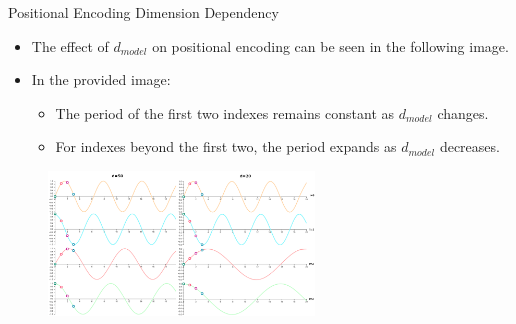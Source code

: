 \documentclass[serif, aspectratio=169]{beamer}
\begin{document}
\begin{frame}{Positional Encoding Dimension Dependency}
	\begin{itemize}
			\item The effect of \( d_{model} \) on positional encoding can be seen in the following image.
			\item In the provided image:
				\begin{itemize}
					\item The period of the first two indexes remains constant as \( d_{model} \) changes.
					\item For indexes beyond the first two, the period expands as \( d_{model} \) decreases.
				\end{itemize}
		
	\end{itemize}
	\vspace{-5pt}
	\begin{figure}
		\centering
		\includegraphics[width=0.63\textwidth]{pic/dimension-comparision.png}
		\label{fig:positional-encoding-1-1-2}
	\end{figure}
	\vspace{5pt}
	\vfill
{}
\end{frame}
\end{document}
